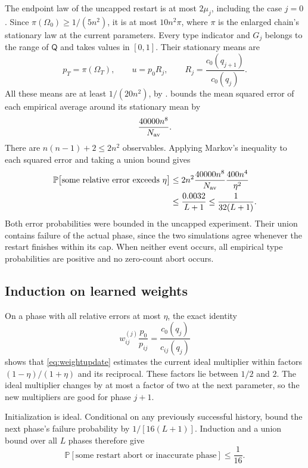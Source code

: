 \documentclass[11pt]{article}
\theoremstyle{definition}
\newcommand{\Prob}{\mathbb P}
\newcommand{\Om}{\Omega}
\newcommand{\Qproj}{\mathsf Q}
\begin{document}
The endpoint law of the uncapped restart is at most $2\mu_j$,
including the case $j=0$.  Since $\pi(\Om_0)\ge1/(5n^2)$, it is at
most $10n^2\pi$, where $\pi$ is the enlarged chain's stationary law at
the current parameters.  Every type indicator and $G_j$ belongs to the
range of $\Qproj$ and takes values in $[0,1]$.  Their stationary means
are
\begin{equation}\label{eq:stationarymeans}
 p_T=\pi(\Om_T),\qquad
 u=p_0R_j,\qquad R_j=\frac{c_0(q_{j+1})}{c_0(q_j)}.
\end{equation}
All these means are at least $1/(20n^2)$, by
.
 bounds the mean squared error of each empirical
average around its stationary mean by
\begin{equation}\label{eq:averageMSE}
 \frac{40000n^8}{N_{\rm av}}.
\end{equation}
There are $n(n-1)+2\le2n^2$ observables.  Applying Markov's inequality
to each squared error and taking a union bound gives
\begin{align}
 \Prob\bigl[\text{some relative error exceeds }\eta\bigr]
 &\le 2n^2\frac{40000n^8}{N_{\rm av}}
                       \frac{400n^4}{\eta^2}\notag\\
 &\le\frac{0.0032}{L+1}\le\frac1{32(L+1)}.
 \label{eq:estimationfailure}
\end{align}
Both error probabilities were bounded in the uncapped experiment.
Their union contains failure of the actual phase, since the two
simulations agree whenever the restart finishes within its cap.
When neither event occurs, all empirical type probabilities are positive
and no zero-count abort occurs.

\subsection{Induction on learned weights}

On a phase with all relative errors at most $\eta$, the exact identity
\[
 w^{(j)}_{ij}\frac{p_0}{p_{ij}}=\frac{c_0(q_j)}{c_{ij}(q_j)}
\]
shows that \eqref{eq:weightupdate} estimates the current ideal multiplier
within factors $(1-\eta)/(1+\eta)$ and its reciprocal.  These factors
lie between $1/2$ and $2$.  The ideal multiplier changes by at most a
factor of two at the next parameter, so the new multipliers are good
for phase $j+1$.

Initialization is ideal.  Conditional on any previously successful
history,  bound the next
phase's failure probability by $1/[16(L+1)]$.  Induction and a union
bound over all $L$ phases therefore give
\begin{equation}\label{eq:analyticfailure}
 \Prob[\text{some restart abort or inaccurate phase}]\le\frac1{16}.
\end{equation}
\end{document}
